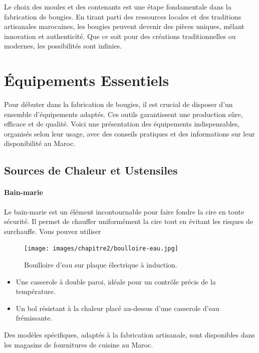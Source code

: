 \documentclass[11pt,fleqn,onecolumn,oneside]{book}
\begin{document}
\begin{corollary}
Le choix des moules et des contenants est une étape fondamentale dans la fabrication de bougies. En tirant parti des ressources locales et des traditions artisanales marocaines, les bougies peuvent devenir des pièces uniques, mêlant innovation et authenticité. Que ce soit pour des créations traditionnelles ou modernes, les possibilités sont infinies.
\end{corollary}

\section{Équipements Essentiels}

Pour débuter dans la fabrication de bougies, il est crucial de disposer d’un ensemble d’équipements adaptés. Ces outils garantissent une production sûre, efficace et de qualité. Voici une présentation des équipements indispensables, organisés selon leur usage, avec des conseils pratiques et des informations sur leur disponibilité au Maroc.

\subsection*{Sources de Chaleur et Ustensiles}

\paragraph{Bain-marie} 
Le bain-marie est un élément incontournable pour faire fondre la cire en toute sécurité. Il permet de chauffer uniformément la cire tout en évitant les risques de surchauffe. Vous pouvez utiliser

\begin{figure}[htbp]
    \centering
    \texttt{[image: images/chapitre2/boulloire-eau.jpg]}
    \caption{Bouilloire d'eau sur plaque électrique à induction.}
    \label{fig:process_coloration}
\end{figure}


\begin{itemize}
    \item Une casserole à double paroi, idéale pour un contrôle précis de la température.
    \item Un bol résistant à la chaleur placé au-dessus d’une casserole d’eau frémissante.
\end{itemize}
Des modèles spécifiques, adaptés à la fabrication artisanale, sont disponibles dans les magasins de fournitures de cuisine au Maroc.
\end{document}
